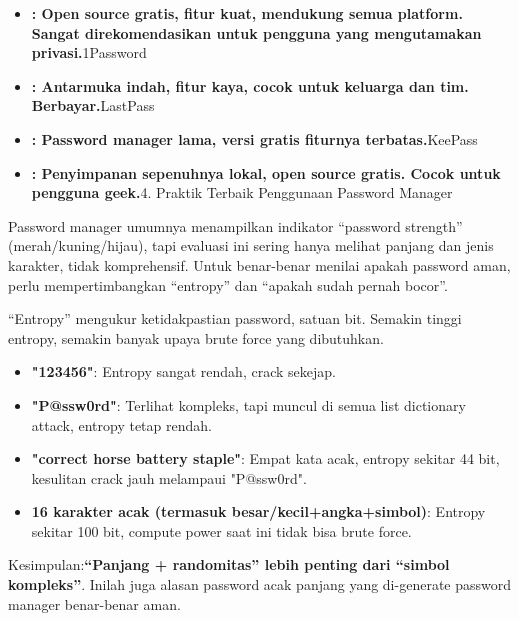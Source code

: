 
\begin{itemize}
  \item \textbf{: Open source gratis, fitur kuat, mendukung semua platform. Sangat direkomendasikan untuk pengguna yang mengutamakan privasi.}1Password
  \item \textbf{: Antarmuka indah, fitur kaya, cocok untuk keluarga dan tim. Berbayar.}LastPass
  \item \textbf{: Password manager lama, versi gratis fiturnya terbatas.}KeePass
  \item \textbf{: Penyimpanan sepenuhnya lokal, open source gratis. Cocok untuk pengguna geek.}4. Praktik Terbaik Penggunaan Password Manager
\end{itemize}


Password manager umumnya menampilkan indikator “password strength” (merah/kuning/hijau), tapi evaluasi ini sering hanya melihat panjang dan jenis karakter, tidak komprehensif. Untuk benar-benar menilai apakah password aman, perlu mempertimbangkan “entropy” dan “apakah sudah pernah bocor”.


“Entropy” mengukur ketidakpastian password, satuan bit. Semakin tinggi entropy, semakin banyak upaya brute force yang dibutuhkan.

\begin{itemize}
  \item \textbf{"123456"}: Entropy sangat rendah, crack sekejap.
  \item \textbf{"P@ssw0rd"}: Terlihat kompleks, tapi muncul di semua list dictionary attack, entropy tetap rendah.
  \item \textbf{"correct horse battery staple"}: Empat kata acak, entropy sekitar 44 bit, kesulitan crack jauh melampaui "P@ssw0rd".
  \item \textbf{16 karakter acak (termasuk besar/kecil+angka+simbol)}: Entropy sekitar 100 bit, compute power saat ini tidak bisa brute force.
\end{itemize}

Kesimpulan:\textbf{“Panjang + randomitas” lebih penting dari “simbol kompleks”}. Inilah juga alasan password acak panjang yang di-generate password manager benar-benar aman.


